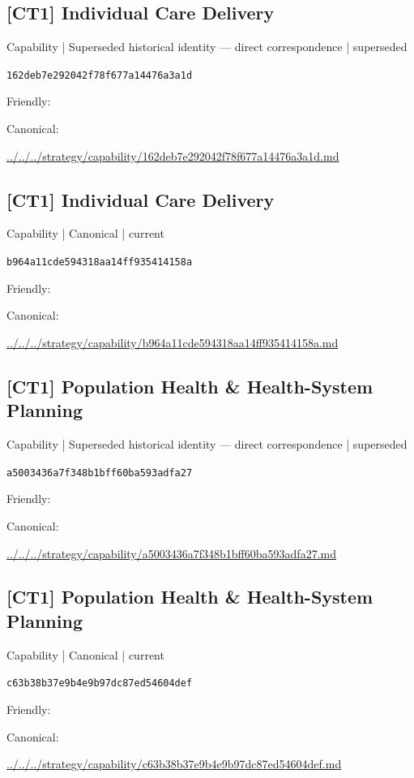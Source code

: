 \documentclass[10pt,a4paper]{article}
\begin{document}
\subsection*{[CT1] Individual Care Delivery}
{\small Capability | Superseded historical identity — direct correspondence | superseded}\par
\texttt{162deb7e292042f78f677a14476a3a1d}\par
Friendly: \par
Canonical: \par
{\footnotesize\url{../../../strategy/capability/162deb7e292042f78f677a14476a3a1d.md}}\par
\subsection*{[CT1] Individual Care Delivery}
{\small Capability | Canonical | current}\par
\texttt{b964a11cde594318aa14ff935414158a}\par
Friendly: \par
Canonical: \par
{\footnotesize\url{../../../strategy/capability/b964a11cde594318aa14ff935414158a.md}}\par
\subsection*{[CT1] Population Health \& Health-System Planning}
{\small Capability | Superseded historical identity — direct correspondence | superseded}\par
\texttt{a5003436a7f348b1bff60ba593adfa27}\par
Friendly: \par
Canonical: \par
{\footnotesize\url{../../../strategy/capability/a5003436a7f348b1bff60ba593adfa27.md}}\par
\subsection*{[CT1] Population Health \& Health-System Planning}
{\small Capability | Canonical | current}\par
\texttt{c63b38b37e9b4e9b97dc87ed54604def}\par
Friendly: \par
Canonical: \par
{\footnotesize\url{../../../strategy/capability/c63b38b37e9b4e9b97dc87ed54604def.md}}\par
\end{document}
